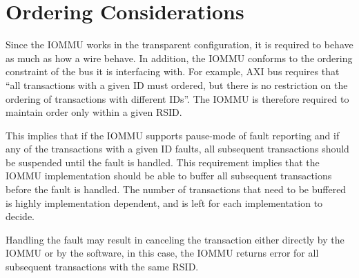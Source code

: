 \section{Ordering Considerations}

Since the IOMMU works in the transparent configuration, it is required to behave as much
as how a wire behave. In addition, the IOMMU conforms to the ordering constraint of the
bus it is interfacing with. For example, AXI bus requires that ``all transactions with a
given ID must ordered, but there is no restriction on the ordering of transactions with
different IDs''. The IOMMU is therefore required to maintain order only within a given
RSID.

This implies that if the IOMMU supports pause-mode of fault reporting and if any of the
transactions with a given ID faults, all subsequent transactions should be suspended until
the fault is handled. This requirement implies that the IOMMU implementation should be
able to buffer all subsequent transactions before the fault is handled. The number of
transactions that need to be buffered is highly implementation dependent, and is left for
each implementation to decide.

Handling the fault may result in canceling the transaction either directly by the IOMMU or
by the software, in this case, the IOMMU returns error for all subsequent transactions
with the same RSID.

